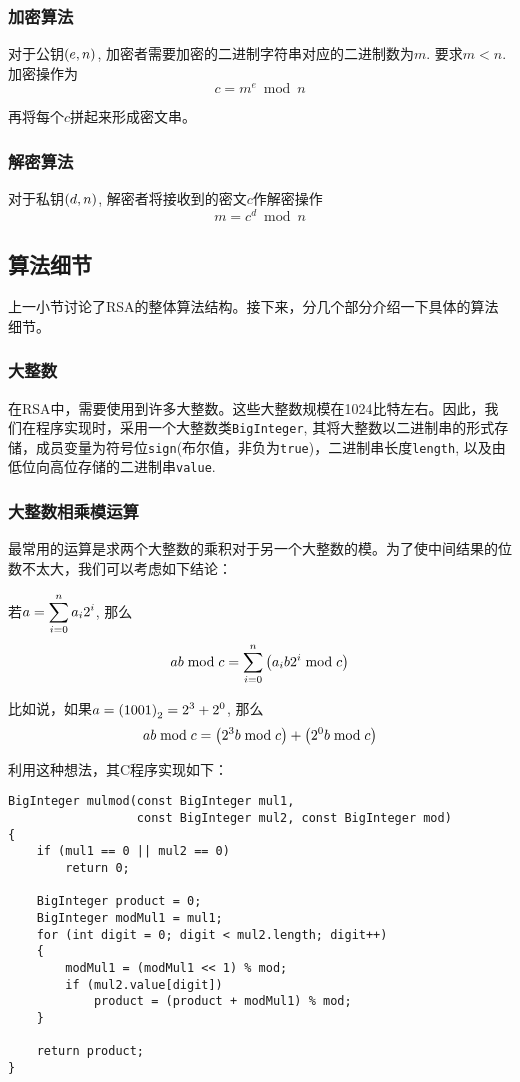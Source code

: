 \subsubsection{加密算法}
对于公钥$\left( {e, n}\right)$, 加密者需要加密的二进制字符串对应的二进制数为$m$. 要求$m<n$. 加密操作为
\begin{equation}
c= m^e\bmod{n}
\end{equation}

再将每个$c$拼起来形成密文串。
\subsubsection{解密算法}
对于私钥$\left( {d, n}\right)$, 解密者将接收到的密文$c$作解密操作
\begin{equation}
m= c^d\bmod{n}
\end{equation}
\subsection{算法细节}
上一小节讨论了RSA的整体算法结构。接下来，分几个部分介绍一下具体的算法细节。
\subsubsection{大整数}
在RSA中，需要使用到许多大整数。这些大整数规模在1024比特左右。因此，我们在程序实现时，采用一个大整数类\verb`BigInteger`, 其将大整数以二进制串的形式存储，成员变量为符号位\verb`sign`(布尔值，非负为\verb`true`)，二进制串长度\verb`length`, 以及由低位向高位存储的二进制串\verb`value`.
\subsubsection{大整数相乘模运算}
最常用的运算是求两个大整数的乘积对于另一个大整数的模。为了使中间结果的位数不太大，我们可以考虑如下结论：\par
若$\displaystyle a=\sum_{i=0}^na_i2^i$, 那么
\begin{equation}
ab\bmod{c}=\sum_{i=0}^n\left( {a_ib2^i\bmod{c}}\right)
\end{equation}

比如说，如果$\displaystyle a=\left( {1001}\right)_2=2^3+2^0$, 那么
\[
ab\bmod{c}=\left( {2^3b\bmod{c}}\right)+\left( {2^0b\bmod{c}}\right)
\]

利用这种想法，其C程序实现如下：
\begin{prove}
\begin{verbatim}
BigInteger mulmod(const BigInteger mul1,
                  const BigInteger mul2, const BigInteger mod)
{
    if (mul1 == 0 || mul2 == 0)
        return 0;
    
    BigInteger product = 0;
    BigInteger modMul1 = mul1;
    for (int digit = 0; digit < mul2.length; digit++)
    {
        modMul1 = (modMul1 << 1) % mod;
        if (mul2.value[digit])
            product = (product + modMul1) % mod;
    }
    
    return product;
}
\end{verbatim}
\end{prove}
